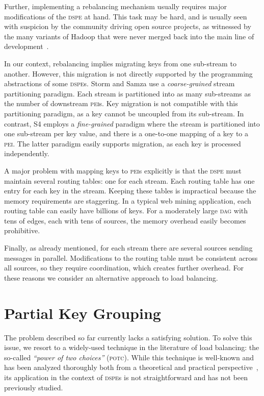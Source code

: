 \documentclass[10pt,conference,letterpaper]{IEEEtran}
\newcommand{\pei}{\textsc{pei}\xspace}
\newcommand{\peis}{{\pei}s\xspace}
\newcommand{\potc}{\textsc{p\textup{o}tc}\xspace}
\newcommand{\dspe}{\textsc{dspe}\xspace}
\newcommand{\dspes}{{\dspe}s\xspace}
\newcommand{\dagr}{\textsc{dag}\xspace}
\begin{document}
Further, implementing a rebalancing mechanism usually requires major modifications of the \dspe at hand.
This task may be hard, and is usually seen with suspicion by the community driving open source projects, as witnessed by the many variants of Hadoop that were never merged back into the main line of development~\citep{abouzeid2009hadoopdb,Dittrich2010hadooppp,yang2007mapreducemerge}.

In our context, rebalancing implies migrating keys from one sub-stream to another.
However, this migration is not directly supported by the programming abstractions of some \dspes.
Storm and Samza use a \emph{coarse-grained} stream partitioning paradigm.
Each stream is partitioned into as many sub-streams as the number of downstream \peis.
Key migration is not compatible with this partitioning paradigm, as a key cannot be uncoupled from its sub-stream. 
In contrast, S4 employs a \emph{fine-grained} paradigm where the stream is partitioned into one sub-stream per key value, and there is a one-to-one mapping of a key to a \pei.
The latter paradigm easily supports migration, as each key is processed independently.




A major problem with mapping keys to \peis explicitly is that the \dspe must maintain several routing tables: one for each stream. Each routing table has one entry for each key in the stream.
Keeping these tables is impractical because the memory requirements are staggering.
In a typical web mining application, each routing table can easily have billions of keys.
For a moderately large \dagr with tens of edges, each with tens of sources, the memory overhead easily becomes prohibitive.

Finally, as already mentioned, for each stream there are several sources sending messages in parallel.
Modifications to the routing table must be consistent across all sources, so they require coordination, which creates further overhead.
For these reasons we consider an alternative approach to load balancing. 






 \section{Partial Key Grouping}
\label{sec:algos}




The problem described so far currently lacks a satisfying solution.
To solve this issue, we resort to a widely-used technique in the literature of load balancing: the so-called \emph{``power of two choices''} (\potc).
While this technique is well-known and has been analyzed thoroughly both from a theoretical and practical perspective~\citep{adler1995parallelrandomized,azar1999balanced-allocations,byers2003geometricgeneralizations,lenzen2011parallelrandomized,mitzenmacher2001power,mitzenmacher2001potc-survey}, its application in the context of \dspes is not straightforward and has not been previously studied.
\end{document}
